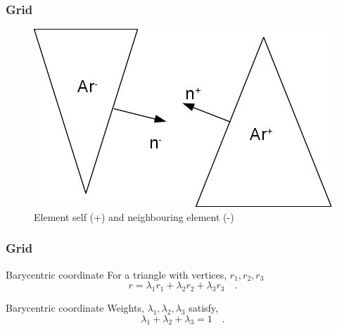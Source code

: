 \documentclass{beamer}
\begin{document}

\begin{frame}
\frametitle{Grid}
\begin{figure}
\centering
  \includegraphics[width=0.9\linewidth]{ch_3_fig_1.jpg}
  \caption{Element self (+) and neighbouring element (-)}
  \label{fig:Self_neighbour}
\end{figure}

\end{frame}


\begin{frame}
\frametitle{Grid}

\begin{block}{Barycentric coordinate}
For a triangle with vertices, $r_1, r_2, r_3$
\begin{equation}\label{barycentric point}
r = \lambda_1 r_1 + \lambda_2 r_2 + \lambda_3 r_3 \quad \textrm{.}
\end{equation}
\end{block}

\begin{block}{Barycentric coordinate}
Weights, $\lambda_1, \lambda_2, \lambda_3$ satisfy,
\begin{equation}\label{lambda constraint} 
\lambda_1 + \lambda_2 + \lambda_3 = 1 \quad \textrm{.}
\end{equation}
\end{block}

\end{frame}
\end{document}
